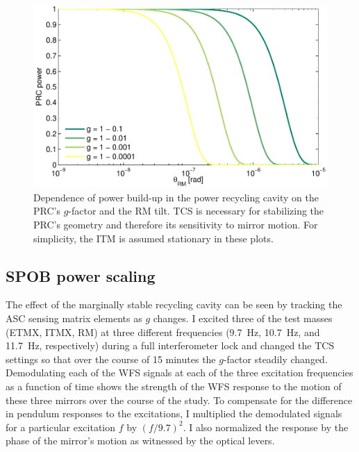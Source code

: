 \begin{figure}
\begin{centering}
\includegraphics[width=1.0\columnwidth]{figures/prc_power.pdf}
\caption[Theoretical dependence of power recycling cavity power on
$g$-factor and mirror angle]{Dependence of power build-up in the power
  recycling cavity on the PRC's $g$-factor and the RM tilt. TCS is
  necessary for stabilizing the PRC's geometry and therefore its
  sensitivity to mirror motion. For simplicity, the ITM is assumed
  stationary in these plots.}
\label{fig:prc_power}
\end{centering}
\end{figure}


\subsection{SPOB power scaling}
The effect of the marginally stable recycling cavity can be seen by
tracking the ASC sensing matrix elements as $g$ changes. I excited
three of the test masses (ETMX, ITMX, RM) at three different
frequencies (9.7~Hz, 10.7~Hz, and 11.7~Hz, respectively) during a full
interferometer lock and changed the TCS settings so that over the
course of 15 minutes the $g$-factor steadily changed. Demodulating
each of the WFS signals at each of the three excitation frequencies as
a function of time shows the strength of the WFS response to the motion
of these three mirrors over the course of the study. To compensate for
the difference in pendulum responses to the excitations, I multiplied
the demodulated signals for a particular excitation $f$ by
$(f/9.7)^2$. I also normalized the response by the phase of the
mirror's motion as witnessed by the optical levers.

